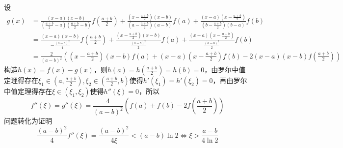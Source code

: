 \begin{solution}
设\begin{align*}
g(x)&=\frac{(x-a)(x-b)}{(\frac{a+b}{2}-a)(\frac{a+b}{2}-b)}f\left(\frac{a+b}{2}\right)+\frac{(x-\frac{a+b}{2})(x-b)}{(a-\frac{a+b}{2})(a-b)}f(a)+\frac{(x-a)(x-\frac{a+b}{2})}{(b-\frac{a+b}{2})(b-a)}f(b)\\
&=\frac{(x-a)(x-b)}{-\frac{(a-b)^2}{4}}f\left(\frac{a+b}{2}\right)+\frac{(x-\frac{a+b}{2})(x-b)}{\frac{(a-b)^2}{2}}f(a)+\frac{(x-a)(x-\frac{a+b}{2})}{\frac{(a-b)^2}{2}}f(b)\\
&=\frac{2}{(a-b)^2}\left((x-\frac{a+b}{2})(x-b)f(a)+(x-a)(x-\frac{a+b}{2})f(b)-2(x-a)(x-b)f\left(\frac{a+b}{2}\right)\right)
\end{align*}
构造$h(x)=f(x)-g(x)$，则$h(a)=h\left(\frac{a+b}{2}\right)=h(b)=0$，由罗尔中值定理得存在$\xi_1\in(a,\frac{a+b}2),\xi_2\in(\frac{a+b}2,b)$使得$h'(\xi_1)=h'(\xi_2)=0$，再由罗尔中值定理得存在$\xi\in(\xi_1,\xi_2)$使得$h''(\xi)=0$，所以\[f''(\xi)=g''(\xi)=\frac{4}{(a-b)^2}\left(f(a)+f(b)-2f\left(\frac{a+b}{2}\right)\right)\]问题转化为证明\[\frac{(a-b)^2}{4}f''(\xi)=\frac{(a-b)^2}{4\xi}<(a-b)\ln 2\Leftrightarrow\xi>\frac{a-b}{4\ln 2}\]
\end{solution}




